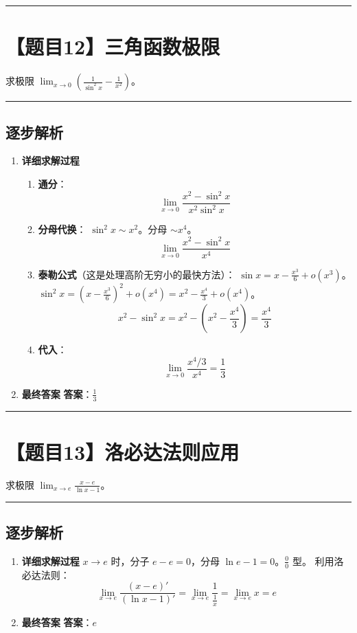 \documentclass[UTF8]{ctexart}
\newenvironment{redenv}{\color{red}}{}
\newenvironment{detailedanalysis}{%
    \color{red}
    \begin{enumerate}[label=\textbf{第\arabic*步：}, leftmargin=*, align=left, itemsep=1.5ex]
}{%
    \end{enumerate}
}
\newcommand{\problemrule}{\noindent\rule{\textwidth}{1.5pt}\vspace{-0.8em}}
\newcommand{\analysisrule}{\noindent\rule{\textwidth}{0.8pt}\vspace{-0.8em}}
\begin{document}
\problemrule
\section*{【题目12】三角函数极限}
求极限 $ \lim_{x \to 0} \left(\frac{1}{\sin^{2} x} - \frac{1}{x^{2}}\right) $。

\begin{redenv}
\analysisrule
\subsection*{逐步解析}

\begin{detailedanalysis}
\item \textbf{详细求解过程}
\begin{enumerate}[label=(\arabic*)]
\item \textbf{通分}：
$$ \lim_{x \to 0} \frac{x^2 - \sin^2 x}{x^2 \sin^2 x} $$
\item \textbf{分母代换}：
$\sin^2 x \sim x^2$。分母 $\sim x^4$。
$$ \lim_{x \to 0} \frac{x^2 - \sin^2 x}{x^4} $$
\item \textbf{泰勒公式}（这是处理高阶无穷小的最快方法）：
$\sin x = x - \frac{x^3}{6} + o(x^3)$。
$\sin^2 x = (x - \frac{x^3}{6})^2 + o(x^4) = x^2 - \frac{x^4}{3} + o(x^4)$。
$$ x^2 - \sin^2 x = x^2 - (x^2 - \frac{x^4}{3}) = \frac{x^4}{3} $$
\item \textbf{代入}：
$$ \lim_{x \to 0} \frac{x^4/3}{x^4} = \frac{1}{3} $$
\end{enumerate}

\item \textbf{最终答案}
\textbf{答案}：$ \frac{1}{3} $
\end{detailedanalysis}
\end{redenv}

\problemrule
\section*{【题目13】洛必达法则应用}
求极限 $ \lim_{x \to e} \frac{x - e}{\ln x - 1} $。

\begin{redenv}
\analysisrule
\subsection*{逐步解析}

\begin{detailedanalysis}
\item \textbf{详细求解过程}
$x \to e$ 时，分子 $e - e = 0$，分母 $\ln e - 1 = 0$。$\frac{0}{0}$ 型。
利用洛必达法则：
$$ \lim_{x \to e} \frac{(x-e)'}{(\ln x - 1)'} = \lim_{x \to e} \frac{1}{\frac{1}{x}} = \lim_{x \to e} x = e $$

\item \textbf{最终答案}
\textbf{答案}：$ e $
\end{detailedanalysis}
\end{redenv}
\end{document}
